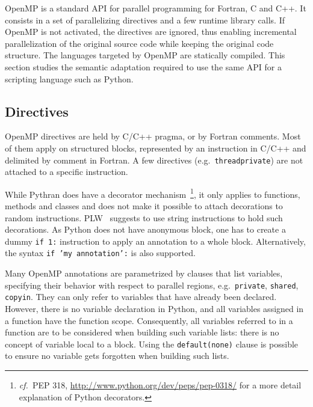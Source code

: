\documentclass{llncs}
\newcommand\see{\emph{cf.\ }}
\begin{document}
OpenMP is a standard API for parallel programming for Fortran, C and C++. It
consists in a set of parallelizing directives and a few runtime library calls.
If OpenMP is not activated, the directives are ignored, thus enabling
incremental parallelization of the original source code while keeping the
original code structure. The languages targeted by OpenMP are statically
compiled. This section studies the semantic adaptation required to use the same
API for a scripting language such as Python.

\subsection{Directives}

OpenMP directives are held by C/C++ pragma, or by Fortran comments. Most of them apply
on structured blocks, represented by an instruction in C/C++ and delimited by
comment in Fortran. A few directives (e.g.\ \texttt{threadprivate}) are not
attached to a specific instruction.

While Pythran does have a decorator mechanism~\footnote{\see PEP 318,
\url{http://www.python.org/dev/peps/pep-0318/} for a more detail explanation of
Python decorators.}, it only applies to functions, methods and classes and does
not make it possible to attach decorations to random instructions.
PLW~\cite{dongara2007} suggests to use string instructions to hold such
decorations. As Python does not have anonymous block,
one has to create a dummy \texttt{if 1:} instruction to apply an annotation to a
whole block. Alternatively, the syntax \texttt{if 'my annotation':} is also
supported. 

%

Many OpenMP annotations are parametrized by clauses that list variables,
specifying their behavior with respect to parallel regions, e.g.\
\texttt{private}, \texttt{shared}, \texttt{copyin}. They can only refer to
variables that have already been declared. However, there is no variable
declaration in Python, and all variables assigned in a function have the
function scope. Consequently, all variables referred to in a function are to be
considered when building such variable lists: there is no concept of variable
local to a block. Using the \texttt{default(none)} clause is possible to ensure
no variable gets forgotten when building such lists.
\end{document}
